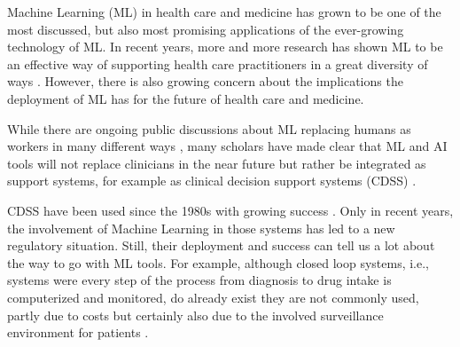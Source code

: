 Machine Learning (ML) in health care and medicine has grown to be one of the most discussed, but also most promising applications of the ever-growing technology of ML.
In recent years, more and more research has shown ML to be an effective way of supporting health care practitioners in a great diversity of ways \cite{rajpurkar2022ai, topol2019high}.
However, there is also growing concern about the implications the deployment of ML has for the future of health care and medicine. 

While there are ongoing public discussions about ML replacing humans as workers in many different ways , many scholars have made clear that ML and AI tools will not replace clinicians in the near future but rather be integrated as support systems, for example as clinical decision support systems (CDSS) \cite{Morley2020}.

CDSS have been used since the 1980s with growing success \cite{sutton2020overview}.
Only in recent years, the involvement of Machine Learning in those systems has led to a new regulatory situation.
Still, their deployment and success can tell us a lot about the way to go with ML tools.
For example, although closed loop systems, i.e., systems were every step of the process from diagnosis to drug intake is computerized and monitored, do already exist they are not commonly used, partly due to costs but certainly also due to the involved surveillance environment for patients \cite{sutton2020overview}. 



